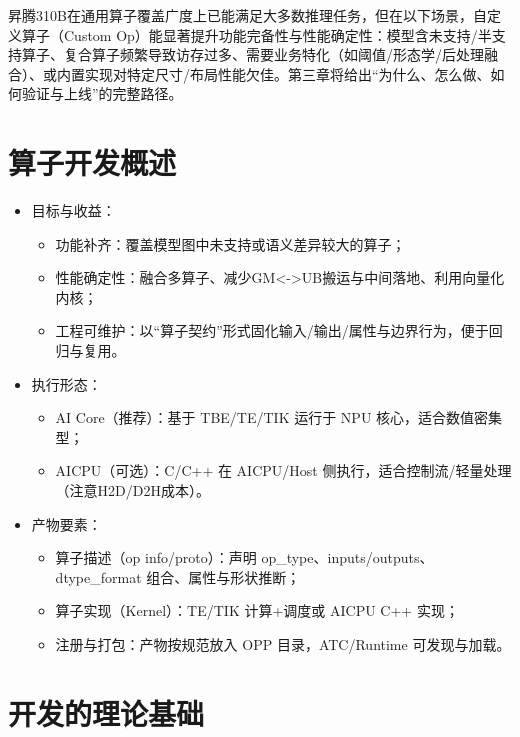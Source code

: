 昇腾310B在通用算子覆盖广度上已能满足大多数推理任务，但在以下场景，自定义算子（Custom
Op）能显著提升功能完备性与性能确定性：模型含未支持/半支持算子、复合算子频繁导致访存过多、需要业务特化（如阈值/形态学/后处理融合）、或内置实现对特定尺寸/布局性能欠佳。第三章将给出``为什么、怎么做、如何验证与上线''的完整路径。

\section{算子开发概述}\label{ux7b97ux5b50ux5f00ux53d1ux6982ux8ff0}

\begin{itemize}
\tightlist
\item
  目标与收益：

  \begin{itemize}
  \tightlist
  \item
    功能补齐：覆盖模型图中未支持或语义差异较大的算子；
  \item
    性能确定性：融合多算子、减少GM\textless-\textgreater UB搬运与中间落地、利用向量化内核；
  \item
    工程可维护：以``算子契约''形式固化输入/输出/属性与边界行为，便于回归与复用。
  \end{itemize}
\item
  执行形态：

  \begin{itemize}
  \tightlist
  \item
    AI Core（推荐）：基于 TBE/TE/TIK 运行于 NPU 核心，适合数值密集型；
  \item
    AICPU（可选）：C/C++ 在 AICPU/Host
    侧执行，适合控制流/轻量处理（注意H2D/D2H成本）。
  \end{itemize}
\item
  产物要素：

  \begin{itemize}
  \tightlist
  \item
    算子描述（op info/proto）：声明
    op\_type、inputs/outputs、dtype\_format 组合、属性与形状推断；
  \item
    算子实现（Kernel）：TE/TIK 计算+调度或 AICPU C++ 实现；
  \item
    注册与打包：产物按规范放入 OPP 目录，ATC/Runtime 可发现与加载。
  \end{itemize}
\end{itemize}

\section{开发的理论基础}\label{ux5f00ux53d1ux7684ux7406ux8bbaux57faux7840}

